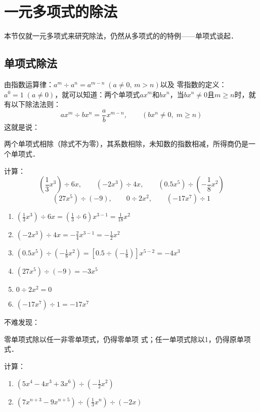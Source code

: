 \section{一元多项式的除法}
本节仅就一元多项式来研究除法，仍然从多项式的的特例——单项式谈起．
\subsection{单项式除法}
由指数运算律：$a^m\div a^n=a^{m-n}\; (a\ne 0,\, m>n)$以及
零指数的定义：$a^0=1\; (a\ne 0)$，就可以知道：两个单项式$ax^m$和$bx^n$，当$bx^n\ne 0$且$m\ge n$时，就有以下除法法则：
\[ax^m\div bx^n =\frac{a}{b}x^{m-n},\qquad (bx^n\ne 0,\; m\ge n) \]
这就是说：

\begin{blk}{}
    两个单项式相除（除式不为零），其系数相除，未知数的指数相减，所得商仍是一个单项式．
\end{blk}

\begin{example}
计算：
\[\left(\frac{1}{3}x^3\right)\div 6x,\qquad (-2x^3)\div 4x,\qquad (0.5x^5)\div \left(-\frac{1}{8}x^2\right)\]
\[(27x^5)\div (-9),\qquad 0\div 2x^2,\qquad (-17x^7)\div 1\]
\end{example}

\begin{solution}
    \begin{enumerate}
        \item $\left(\frac{1}{3}x^3\right)\div 6x=\left(\frac{1}{3}\div 6\right)x^{3-1}=\frac{1}{18}x^2$
        \item $(-2x^3)\div 4x=-\frac{2}{4}x^{3-1}=-\frac{1}{2}x^2$
        \item $(0.5x^5)\div \left(-\frac{1}{8}x^2\right)=\left[0.5\div \left(-\frac{1}{8}\right)\right]x^{5-2}=-4x^3$
        \item $(27x^5)\div (-9)=-3x^5$
        \item $0\div 2x^2=0$
        \item $(-17x^7)\div 1=-17x^7$
    \end{enumerate}
\end{solution}

不难发现：
\begin{blk}{}
    零单项式除以任一非零单项式，仍得零单项
    式；任一单项式除以1，仍得原单项式．
\end{blk}

\begin{example}
  计算：
\begin{enumerate}
    \item $(5x^4-4x^3+3x^6)\div \left(-\frac{1}{2}x^2\right)$
    \item $(7x^{n+3}-9x^{n+5})\div \left(\frac{1}{3}x^n\right)\div (-2x)$
\end{enumerate}
\end{example}

